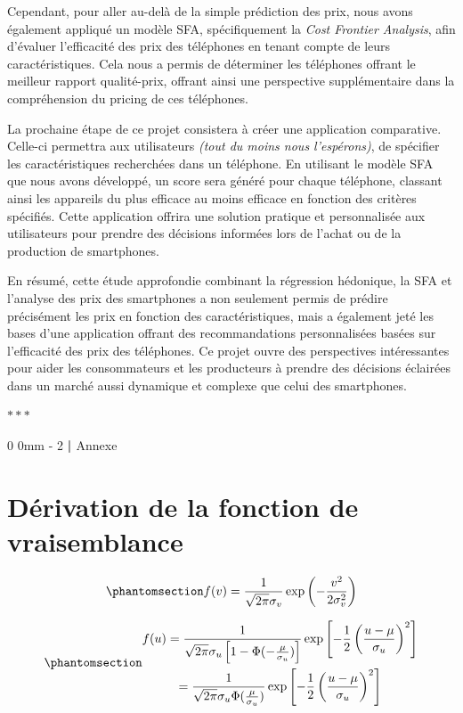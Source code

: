 \documentclass[
  12pt,
]{report}
\makeatletter
\newcommand{\macrostars}{
    \vspace{2em}
    \begin{center}
        \textcolor{highlight!80!black}{\Large{$\ast\ast\ast$}}
    \end{center}
}
\renewcommand{\chapter}{%
    \clearpage %
    \@startsection{chapter}%
    {0} %
    {0mm} %
    {-\baselineskip} %
    {2\baselineskip} %
    {\normalfont\Huge\bfseries | \Huge\bfseries}%
}
\makeatother
\begin{document}
Cependant, pour aller au-delà de la simple prédiction des prix, nous
avons également appliqué un modèle SFA, spécifiquement la \emph{Cost
Frontier Analysis}, afin d'évaluer l'efficacité des prix des téléphones
en tenant compte de leurs caractéristiques. Cela nous a permis de
déterminer les téléphones offrant le meilleur rapport qualité-prix,
offrant ainsi une perspective supplémentaire dans la compréhension du
pricing de ces téléphones.

La prochaine étape de ce projet consistera à créer une application
comparative. Celle-ci permettra aux utilisateurs \emph{(tout du moins
nous l'espérons)}, de spécifier les caractéristiques recherchées dans un
téléphone. En utilisant le modèle SFA que nous avons développé, un score
sera généré pour chaque téléphone, classant ainsi les appareils du plus
efficace au moins efficace en fonction des critères spécifiés. Cette
application offrira une solution pratique et personnalisée aux
utilisateurs pour prendre des décisions informées lors de l'achat ou de
la production de smartphones.

En résumé, cette étude approfondie combinant la régression hédonique, la
SFA et l'analyse des prix des smartphones a non seulement permis de
prédire précisément les prix en fonction des caractéristiques, mais a
également jeté les bases d'une application offrant des recommandations
personnalisées basées sur l'efficacité des prix des téléphones. Ce
projet ouvre des perspectives intéressantes pour aider les consommateurs
et les producteurs à prendre des décisions éclairées dans un marché
aussi dynamique et complexe que celui des smartphones.

\macrostars

\chapter{Annexe}\label{annexe}

\section{Dérivation de la fonction de
vraisemblance}\label{duxe9rivation-de-la-fonction-de-vraisemblance}

\begin{equation}\phantomsection\label{eq-fv}{
f(v) = \frac{1}{\sqrt{2\pi}\sigma_v}\exp{\left(-\frac{v^2}{2\sigma^2_v} \right)}
}\end{equation}

\begin{equation}\phantomsection\label{eq-fu}{
\begin{gathered}
f(u) = \frac{1}{\sqrt{2\pi}\sigma_u\left[1-\Phi(-\frac{\mu}{\sigma_u})\right]}\exp\left[-\frac{1}{2}\left(\frac{u-\mu}{\sigma_u}\right)^2 \right]\\
= \frac{1}{\sqrt{2\pi}\sigma_u\Phi(\frac{\mu}{\sigma_u})}\exp\left[-\frac{1}{2}\left(\frac{u-\mu}{\sigma_u}\right)^2 \right]
\end{gathered}
}\end{equation}
\end{document}
